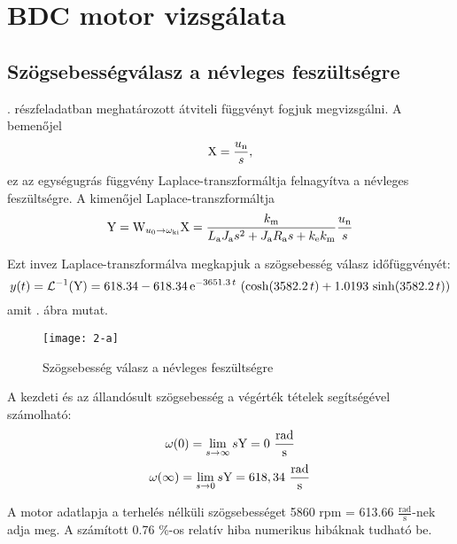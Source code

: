 \section{BDC motor vizsgálata}

\subsection{Szögsebességválasz a névleges feszültségre}

. részfeladatban meghatározott átviteli függvényt fogjuk megvizsgálni.
A bemenőjel
\begin{equation}
	\mathrm{X} = \frac{u_\text{n}}{s},
\end{equation}
ez az egységugrás függvény Laplace-transzformáltja felnagyítva a névleges feszültségre.
A kimenőjel Laplace-transzformáltja
\begin{equation}
	\mathrm{Y} = \mathrm{W}_{u_0\rightarrow\omega_\text{ki}}\mathrm{X} = \frac{k_\text{m} }{L_\text{a}J_\text{a} s^2 + J_\text{a}R_\text{a} s + k_\text{e}k_\text{m}}\frac{u_\text{n}}{s}
\end{equation}

Ezt invez Laplace-transzformálva megkapjuk a szögsebesség válasz időfüggvényét:
\begin{equation}
	y(t) = \mathcal{L}^{-1}(\mathrm{Y}) = 
	618.34 - 618.34\, \mathrm{e}^{- 3651.3\, t}\, \left(\cosh\!\left(3582.2\, t\right) + 1.0193\, \sinh\!\left(3582.2\, t\right)\right)
\end{equation}
amit . ábra mutat.

\begin{figure}[H]
	\centering
	\texttt{[image: 2-a]}
	\caption{Szögsebesség válasz a névleges feszültségre}
	\label{fig:2-a}
\end{figure}

A kezdeti és az állandósult szögsebesség a végérték tételek segítségével számolható:
\begin{equation}
	\omega(0) = \lim\limits_{s\rightarrow \infty}s\mathrm{Y} = 0~\frac{\text{rad}}{\text{s}}
\end{equation}
\begin{equation}
	\omega(\infty) = \lim\limits_{s\rightarrow 0}s\mathrm{Y} = 618,34~\frac{\text{rad}}{\text{s}}
\end{equation}

A motor adatlapja a terhelés nélküli szögsebességet 5860 rpm = 613.66 $\frac{\text{rad}}{\text{s}}$-nek adja meg. A számított 0.76 \%-os relatív hiba numerikus hibáknak tudható be.

